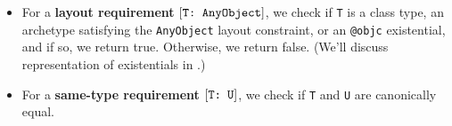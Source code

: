 \documentclass[../generics]{subfiles}
\begin{document}
\begin{algorithm}
\begin{itemize}
\begin{enumerate}
\end{enumerate}
\item For a \textbf{layout requirement} $[\texttt{T:~AnyObject}]$, we check if \texttt{T} is a class type, an archetype satisfying the \texttt{AnyObject} layout constraint, or an \texttt{@objc} existential, and if so, we return true. Otherwise, we return false. (We'll discuss representation of existentials in .)
\item For a \textbf{same-type requirement} $[\texttt{T:~U}]$, we check if \texttt{T} and \texttt{U} are canonically equal.
\end{itemize}
\end{algorithm}
\end{document}
